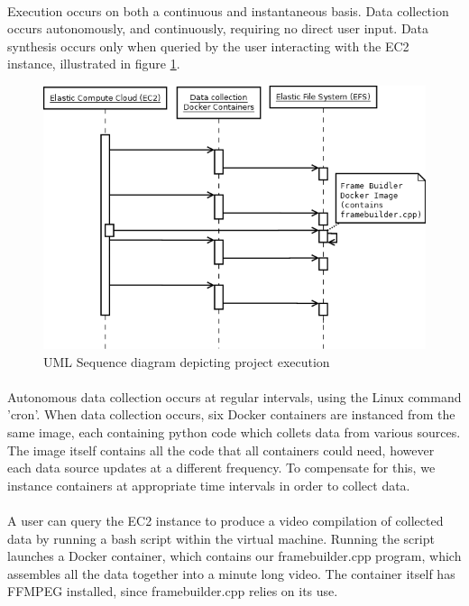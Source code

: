 \documentclass{article}
\begin{document}
  \paragraph{}
  Execution occurs on both a continuous and instantaneous basis. Data collection occurs autonomously, and continuously, requiring no direct user input. Data synthesis occurs only when queried by the user interacting with the EC2 instance, illustrated in figure \ref{sequence_diagram}.
  \begin{figure}[H]
    \centering
    \includegraphics[width=0.9\linewidth]{img/sequence_diagram.png}
    \caption{UML Sequence diagram depicting project execution}
    \label{sequence_diagram}
  \end{figure}
  \paragraph{}
  Autonomous data collection occurs at regular intervals, using the Linux command 'cron'. When data collection occurs, six Docker containers are instanced from the same image, each containing python code which collets data from various sources. The image itself contains all the code that all containers could need, however each data source updates at a different frequency. To compensate for this, we instance containers at appropriate time intervals in order to collect data.
  \paragraph{}
  A user can query the EC2 instance to produce a video compilation of collected data by running a bash script within the virtual machine. Running the script launches a Docker container, which contains our framebuilder.cpp program, which assembles all the data together into a minute long video. The container itself has FFMPEG installed, since framebuilder.cpp relies on its use.
\newpage
\end{document}
